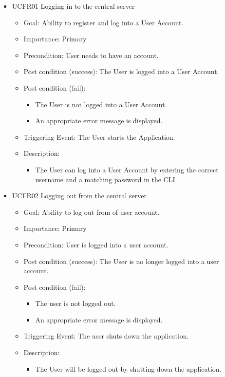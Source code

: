     \begin{itemize}
    \item UCFR01 Logging in to the central server
    \begin{itemize}
      \item Goal: Ability to register and log into a User Account.
      \item Importance: Primary
      \item Precondition: User needs to have an account.
      \item Post condition (success): The User is logged into a User Account.
      \item Post condition (fail):
      \begin{itemize}  
        \item The User is not logged into a User Account.
        \item An appropriate error message is displayed.
      \end{itemize}
      \item Triggering Event: The User starts the Application.
      \item Description:
      \begin{itemize}
        \item   The User can log into a User Account by entering the correct username and a matching password in the CLI
      \end{itemize}
    \end{itemize}
    
    \item UCFR02 Logging out from the central server
    \begin{itemize}
      \item Goal: Ability to log out from of user account.
      \item Importance: Primary
      \item Precondition: User is logged into a user account.
      \item Post condition (success): The User is no longer logged into a user account.
      \item Post condition (fail):
      \begin{itemize}
        \item The user is not logged out.
        \item An appropriate error message is displayed.
      \end{itemize}
      \item Triggering Event: The user shuts down the application.
      \item Description:
      \begin{itemize}
        \item The User will be logged out by shutting down the application.
      \end{itemize}
    \end{itemize}
    

\end{itemize}
